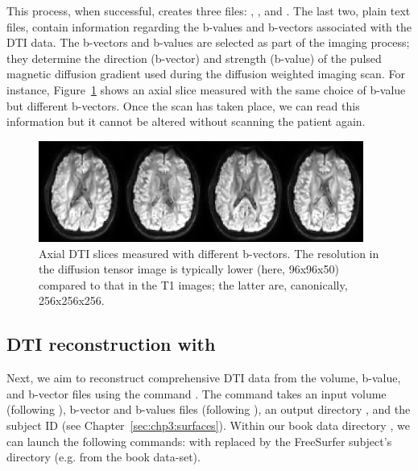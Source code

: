 This process, when successful, creates three files: ,
, and . The last two, plain
text files, contain information regarding the b-values and
b-vectors associated with the DTI data. %
% 
The b-vectors and b-values are selected as part of the imaging process; they 
determine the direction (b-vector) and strength (b-value) of the pulsed  
magnetic diffusion gradient used during the diffusion weighted imaging scan. 
For instance, Figure~\ref{fig:chp5:DTIslices} shows an axial slice measured 
with the same choice of b-value but different b-vectors. Once the scan has 
taken place, we can read this information but it cannot be altered without 
scanning the patient again. 
\begin{figure}	
\begin{center}
  \includegraphics[width=0.95\textwidth]{./graphics/chp5/dwi.png}
\end{center}
\caption{Axial DTI slices measured with different b-vectors. The
  resolution in the diffusion tensor image is typically lower (here, 96x96x50)
	compared to that in the T1 images; the latter are, canonically, 
	256x256x256.}
\label{fig:chp5:DTIslices}
\end{figure}

\subsection{DTI reconstruction with \freesurfer}
\label{sec:chp-dti:freesurfer-dtrecon}
Next, we aim to reconstruct comprehensive DTI data from the volume,
b-value, and b-vector files using the \freesurfer{} command
. The command takes an input volume (following
), b-vector and b-values files (following ), an
output directory , and the  subject ID
 (see Chapter~\ref{sec:chp3:surfaces}). Within our book data 
directory , we can launch the following commands:
\noindent with  replaced by the FreeSurfer subject's
directory (e.g.  from the book data-set).

